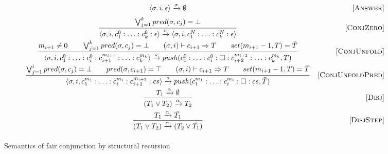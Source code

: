 \begin{figure}[h!]
\[\begin{array}{cr}

      {\langle \sigma, i, \epsilon \rangle \xrightarrow{\sigma} \emptyset}  
&     \mbox{[\textsc{Answer}]} \\[2mm]
\dfrac{\bigvee_{j=1}^k pred(\sigma, c_j) = \bot}
      {\langle \sigma, i, c_1^0 : \ldots : c_k^0 : \epsilon \rangle \xrightarrow{\circ} \langle \sigma, i, c_1^N : \ldots : c_k^N : \epsilon \rangle}
&     \mbox{[\textsc{ConjZero}]} \\[4mm]
\dfrac{m_{i+1} \not= 0 \qquad \bigvee_{j=1}^k pred(\sigma, c_j) = \bot \qquad (\sigma, i) \vdash c_{i+1} \Rightarrow T \qquad set(m_{i+1} - 1, T) = \bar{T}}
      {\langle \sigma, i, c_1^0 : \ldots : c_i^0 : c_{i+1}^{m_{i+1}} : \ldots : c_k^{m_k} \rangle \xrightarrow{\circ} push(c_1^0 : \ldots : c_i^0 : \Box : c_{i+2}^{m_{i+2}} : \ldots : c_k^{m_k}, \bar{T})}
&     \mbox{[\textsc{ConjUnfold}]} \\[4mm]
\dfrac{\bigvee_{j=1}^i pred(\sigma, c_j) = \bot \qquad pred(\sigma, c_{i+1}) = \top \qquad (\sigma, i) \vdash c_{i+1} \Rightarrow T \qquad set(m_{i+1} - 1, T) = \bar{T}}
      {\langle \sigma, i, c_1^{m_1} : \ldots : c_i^{m_i} : c_{i+1}^{m_{i+1}} : cs \rangle \xrightarrow{\circ} push(c_1^{m_1} : \ldots : c_i^{m_i} : \Box : cs, \bar{T})}
&     \mbox{[\textsc{ConjUnfoldPred}]} \\[4mm]
\dfrac{T_1 \xrightarrow{\alpha} \emptyset}
      {(T_1 \lor T_2) \xrightarrow{\alpha} T_2}
&     \mbox{[\textsc{Disj}]} \\[4mm]
\dfrac{T_1 \xrightarrow{\alpha} \bar{T_1}}
      {(T_1 \lor T_2) \xrightarrow{\alpha} (T_2 \lor\bar{T_1})}
&     \mbox{[\textsc{DisjStep}]} \\[4mm]
\end{array}\]
\caption{Semantics of fair conjunction by structural recursion}
\label{fair:structural-recursion-semantics}
\end{figure}

